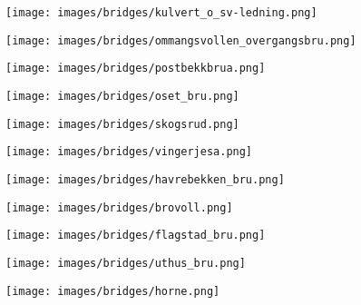 \begin{figure}[H]
    \centering
    \texttt{[image: images/bridges/kulvert\_o\_sv-ledning.png]}
\end{figure}
            
\begin{figure}[H]
    \centering
    \texttt{[image: images/bridges/ommangsvollen\_overgangsbru.png]}
\end{figure}
            
\begin{figure}[H]
    \centering
    \texttt{[image: images/bridges/postbekkbrua.png]}
\end{figure}
            
\begin{figure}[H]
    \centering
    \texttt{[image: images/bridges/oset\_bru.png]}
\end{figure}
            
\begin{figure}[H]
    \centering
    \texttt{[image: images/bridges/skogsrud.png]}
\end{figure}
            
\begin{figure}[H]
    \centering
    \texttt{[image: images/bridges/vingerjesa.png]}
\end{figure}
            
\begin{figure}[H]
    \centering
    \texttt{[image: images/bridges/havrebekken\_bru.png]}
\end{figure}
            
\begin{figure}[H]
    \centering
    \texttt{[image: images/bridges/brovoll.png]}
\end{figure}
            
\begin{figure}[H]
    \centering
    \texttt{[image: images/bridges/flagstad\_bru.png]}
\end{figure}
            
\begin{figure}[H]
    \centering
    \texttt{[image: images/bridges/uthus\_bru.png]}
\end{figure}
            
\begin{figure}[H]
    \centering
    \texttt{[image: images/bridges/horne.png]}
\end{figure}
            
